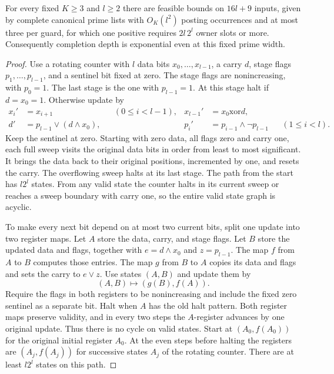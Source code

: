 \begin{corollary}
\label{core:cor:width-three-depth}
For every fixed $K\ge3$ and $l\ge2$ there are feasible bounds on
$16l+9$ inputs, given by complete canonical prime lists with
$O_K(l^2)$ posting occurrences and at most three per guard, for which
one positive requires $2l\,2^l$ owner slots or more. Consequently
completion depth is exponential even at this fixed prime width.
\end{corollary}
\begin{proof}
Use a rotating counter with $l$ data bits $x_0,\ldots,x_{l-1}$,
a carry $d$, stage flags $p_1,\ldots,p_{l-1}$, and a sentinel
bit fixed at zero. The stage flags are nonincreasing, with
$p_0=1$. The last stage is the one with $p_{l-1}=1$.
At this stage halt if $d=x_0=1$. Otherwise update by
\[
 \begin{aligned}
 x_i'&=x_{i+1} &&(0\le i<l-1),&
 x_{l-1}'&=x_0\mathbin{\mathrm{xor}}d,\\
 d'&=p_{l-1}\lor(d\land x_0),&&&
 p_i'&=p_{i-1}\land\neg p_{l-1} &&(1\le i<l).
 \end{aligned}
\]
Keep the sentinel at zero. Starting with zero data, all flags
zero and carry one, each full sweep visits the original data bits
in order from least to most significant. It brings the data back
to their original positions, incremented by one, and resets
the carry. The overflowing sweep halts at its last stage.
The path from the start has $l2^l$ states. From any valid
state the counter halts in its current sweep or reaches a
sweep boundary with carry one, so the entire valid state
graph is acyclic.

To make every next bit depend on at most two current bits,
split one update into two register maps. Let $A$ store the
data, carry, and stage flags. Let $B$ store the updated data
and flags, together with $e=d\land x_0$ and $z=p_{l-1}$.
The map $f$ from $A$ to $B$ computes those entries. The map
$g$ from $B$ to $A$ copies its data and flags and sets the
carry to $e\lor z$. Use states $(A,B)$ and update them by
\[
                       (A,B)\longmapsto (g(B),f(A)).
\]
Require the flags in both registers to be nonincreasing and
include the fixed zero sentinel as a separate bit. Halt when
$A$ has the old halt pattern. Both register maps preserve
validity, and in every two steps the $A$-register advances
by one original update. Thus there is no cycle on valid
states. Start at $(A_0,f(A_0))$ for the original initial
register $A_0$. At the even steps before halting the registers
are $(A_j,f(A_j))$ for successive states $A_j$ of the rotating
counter. There are at least $l2^l$ states on this path.


\end{proof}
